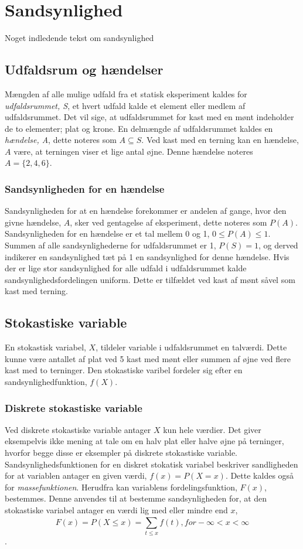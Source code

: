 \section{Sandsynlighed}
Noget indledende tekst om sandsynlighed

\subsection{Udfaldsrum og hændelser}
Mængden af alle mulige udfald fra et statisk eksperiment kaldes for \emph{udfaldsrummet,  S}, et hvert udfald kalde et element eller medlem af udfaldsrummet. Det vil sige, at udfaldsrummet for kast med en mønt indeholder de to elementer; plat og krone.
\newline
En delmængde af udfaldsrummet kaldes en \emph{hændelse, A}, dette noteres som $A \subseteq S$. Ved kast med en terning kan en hændelse, $A$ være, at terningen viser et lige antal øjne. Denne hændelse noteres $A=\{2,4,6\}$.


\subsubsection{Sandsynligheden for en hændelse}
Sandsynligheden for at en hændelse forekommer er andelen af gange, hvor den givne hændelse, $A$, sker ved gentagelse af eksperiment, dette noteres som $P(A)$. Sandsynligheden for en hændelse er et tal mellem 0 og 1, $0 \le P(A) \le 1$. Summen af alle sandsynlighederne for udfaldsrummet er 1, $P(S)=1$, og derved indikerer en sandsynlighed tæt på 1 en sandsynlighed for denne hændelse.
\newline
Hvis der er lige stor sandsynlighed for alle udfald i udfaldsrummet kalde sandsynlighedsfordelingen uniform. Dette er tilfældet ved kast af mønt såvel som kast med terning.


\subsection{Stokastiske variable}
En stokastisk variabel, $X$, tildeler variable i udfaldsrummet en talværdi. Dette kunne være antallet af plat ved 5 kast med mønt eller summen af øjne ved flere kast med to terninger. Den stokastiske varibel fordeler sig efter en sandsynlighedfunktion, $f(X)$.

\subsubsection{Diskrete stokastiske variable}
Ved diskrete stokastiske variable antager $X$ kun hele værdier. Det giver eksempelvis ikke mening at tale om en halv plat eller halve øjne på terninger, hvorfor begge disse er eksempler på diskrete stokastiske variable.
Sandsynlighedsfunktionen for en diskret stokatisk variabel beskriver sandligheden for at variablen antager en given værdi, $f(x)=P(X=x)$. Dette kaldes også for \emph{massefunktionen}.
Herudfra kan variablens fordelingsfunktion, $F(x)$, bestemmes. Denne anvendes til at bestemme sandsynligheden for, at den stokastiske variabel antager en værdi lig med eller mindre end $x$, $$F(x)=P(X \le x)=\sum_{t \le x}^{} f(t), for  -\infty < x < \infty$$.

